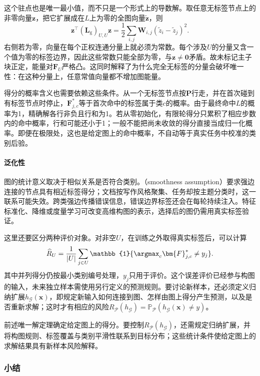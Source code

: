 这个驻点也是唯一最小值，而不只是一个形式上的导数解。取任意无标签节点上的非零向量$\bm{z}$，把它扩展成在$L$上为零的全图向量$\widetilde{\bm{z}}$，则
\[
  \bm{z}^{\top}(\bm{L}_{\mathrm{g}})_{U,U}\bm{z}
    =\frac12\sum_{i,j}\bm{W}_{i,j}
      (\widetilde z_i-\widetilde z_j)^2.
\]
右侧若为零，向量在每个正权连通分量上就必须为常数。每个涉及$U$的分量又含一个值为零的标签边界，因此这些常数只能全部为零，与$\bm{z}\ne\bm{0}$矛盾。故未标记主子块正定，能量对$\bm{F}_U$严格凸。这同时解释了为什么完全无标签的分量会破坏唯一性：在这种分量上，任意常值向量都不增加图能量。

得分的概率含义也需要依赖这些条件。从一个无标签节点按$\bm{P}$行走，并在首次碰到有标签节点时停止，$\bm{F}_{j,c}^\ast$等于首次命中的标签属于类$c$的概率。由于最终命中$L$的概率为1，精确解各行非负且行和为1。若从零初始化，有限轮得分只累积了相应步数内的命中概率，行和可能还小于1；一般不能把尚未收敛的得分直接当成归一化概率。即便在极限处，这也是给定图上的命中概率，不自动等于真实任务中校准的类别后验。

\paragraph{泛化性}
图的统计意义取决于相似关系是否符合类别。（smoothness assumption）要求强边连接的节点具有相近标签得分；文档按写作风格聚集、任务却按主题分类时，这一联系可能失效。跨类强边传播错误信息，错误边界标签还会在每轮持续注入。特征标准化、降维或度量学习可改变高维构图的表示，选择后的图仍需用真实标签验证。

这里还要区分两种评价对象。对非空$U$，在训练之外取得真实标签后，可以计算
\begin{equation}
  \label{eq:classification-label-propagation-pool-risk}
  \widehat R_U
    =\frac{1}{|U|}\sum_{j\in U}
      \mathbb{1}\{\argmax_c\bm{F}_{j,c}^\ast\ne y_j\}.
\end{equation}
其中并列得分仍按最小类别编号处理，$y_j$只用于评价。这个误差评价已经参与构图的输入，未来独立样本需使用另行定义的预测规则。要讨论新样本，还必须定义归纳扩展$h_{\mathcal{G}}(\bm{x})$，即规定新输入如何连接到图、怎样由图上得分产生预测，以及是否重新求解；这时才有相应的风险$R_{\mathcal{P}}(h_{\mathcal{G}})=\mathbb{P}_{\mathcal{P}}(h_{\mathcal{G}}(\bm{x})\ne y)$。

前述唯一解定理确定给定图上的得分。要控制$R_{\mathcal{P}}(h_{\mathcal{G}})$，还需规定归纳扩展，并将构图规则、标签覆盖与类别平滑性联系到目标分布；这些统计条件使给定图上的求解结果具有新样本风险解释。

\subsubsection{小结}
\label{sec:classification-label-propagation-summary}

